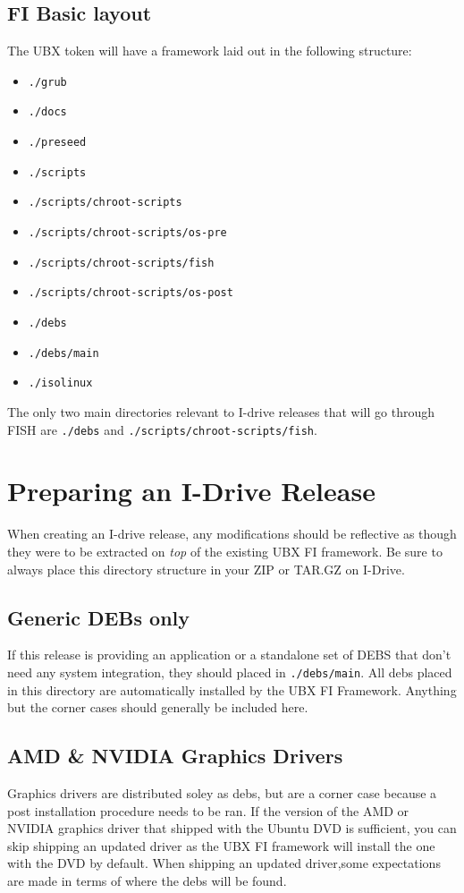 \documentclass[letterpaper,10pt,titlepage]{article}
\begin{document}
\subsection{FI Basic layout}
The UBX token will have a framework laid out in the following structure:
\begin{itemize}
\item \texttt{./grub}
\item \texttt{./docs}
\item \texttt{./preseed}
\item \texttt{./scripts}
\item \texttt{./scripts/chroot-scripts}
\item \texttt{./scripts/chroot-scripts/os-pre}
\item \texttt{./scripts/chroot-scripts/fish}
\item \texttt{./scripts/chroot-scripts/os-post}
\item \texttt{./debs}
\item \texttt{./debs/main}
\item \texttt{./isolinux}
\end{itemize}

The only two main directories relevant to I-drive releases that will go through FISH are \texttt{./debs} and \texttt{./scripts/chroot-scripts/fish}.

\section{Preparing an I-Drive Release}
When creating an I-drive release, any modifications should be reflective as though they were to be extracted on \textit{top} of  the existing UBX FI framework.  Be sure to always place this directory structure in your ZIP or TAR.GZ on I-Drive.

\subsection{Generic DEBs only}
If this release is providing an application or a standalone set of DEBS that don't need any system integration, they should placed in
\texttt{./debs/main}.  All debs placed in this directory are automatically installed by the UBX FI Framework.
Anything but the corner cases should generally be included here.  

\subsection{ AMD \& NVIDIA Graphics Drivers}
Graphics drivers are distributed soley as debs, but are a corner case because a post installation procedure needs to be ran.  If the version of the AMD or NVIDIA graphics driver that shipped with the Ubuntu DVD is sufficient, you can skip shipping an updated driver as the UBX FI framework will install the one with the DVD by default.  When shipping an updated driver,some expectations are made in terms of where the debs will be found.
\end{document}
